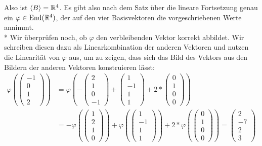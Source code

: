 Also ist \( \langle B \rangle = \mathbb{R}^4 \). Es gibt also nach dem Satz über die lineare Fortsetzung genau ein \( \varphi \in \text{End}(\mathbb{R}^4) \), der auf den vier Basisvektoren die vorgeschriebenen Werte annimmt.
\\*
Wir überprüfen noch, ob \( \varphi \) den verbleibenden Vektor korrekt abbildet. Wir schreiben diesen dazu als Linearkombination der anderen Vektoren und nutzen die Linearität von \( \varphi \) aus, um zu zeigen, dass sich das Bild des Vektors aus den Bildern der anderen Vektoren konstruieren lässt:
\begin{align*}
	\varphi \left( \begin{pmatrix}
		-1 \\ 0 \\ 1 \\ 2
	\end{pmatrix} \right) &= \varphi \left( - \begin{pmatrix}
		2 \\ 1 \\ 0 \\ -1
	\end{pmatrix} + \begin{pmatrix}
		1 \\ -1 \\ 1 \\ 1
	\end{pmatrix} + 2* \begin{pmatrix}
		0 \\ 1 \\ 0 \\ 0
	\end{pmatrix} \right) \\ &= - \varphi \left( \begin{pmatrix}
		1 \\ 2 \\ 1 \\ 0
	\end{pmatrix} \right) + \varphi \left( \begin{pmatrix}
		1 \\ -1 \\ 1 \\ 1
	\end{pmatrix} \right) + 2* \varphi \left( \begin{pmatrix}
		0 \\ 1 \\ 0 \\ 0
	\end{pmatrix} \right) = \begin{pmatrix}
		2 \\ -7 \\ 2 \\ 3
	\end{pmatrix}
\end{align*}

